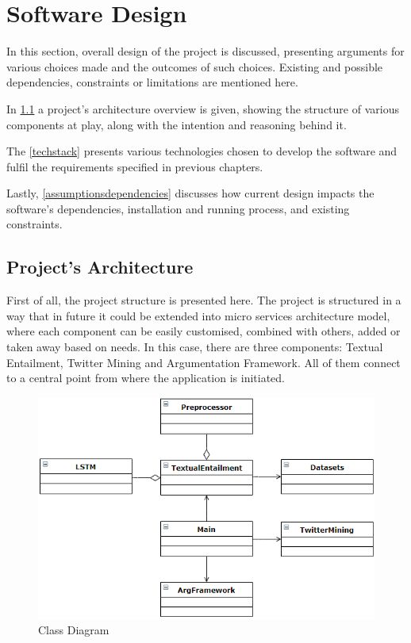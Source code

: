 \section{Software Design}
    In this section, overall design of the project is discussed, presenting arguments for various choices made and the outcomes of such choices. Existing and possible dependencies, constraints or limitations are mentioned here.
    
    In \cref{architecture} a project's architecture overview is given, showing the structure of various components at play, along with the intention and reasoning behind it.
    
    The \cref{techstack} presents various technologies chosen to develop the software and fulfil the requirements specified in previous chapters.
    
    Lastly, \cref{assumptionsdependencies} discusses how current design impacts the software's dependencies, installation and running process, and existing constraints.
    
    \subsection{Project's Architecture} \label{architecture}
    
        First of all, the project structure is presented here. The project is structured in a way that in future it could be extended into micro services architecture model, where each component can be easily customised, combined with others, added or taken away based on needs. In this case, there are three components: Textual Entailment, Twitter Mining and Argumentation Framework. All of them connect to a central point from where the application is initiated.
        
        \begin{figure}[!htbp]
            \centering
            \includegraphics[scale=0.75]{img/classdiag.png}
            \caption{Class Diagram}
            \label{fig:classdiag}
        \end{figure}
        
